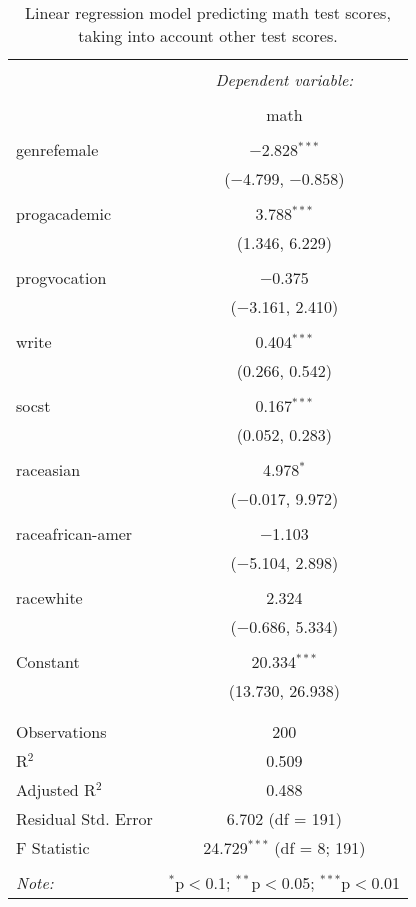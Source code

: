 
\begin{table}[!htbp] \centering 
  \caption{Linear regression model predicting math test scores, taking into 
          account other test scores.} 
  \label{tab::lm_math_peeking} 
\begin{tabular}{@{\extracolsep{5pt}}lc} 
\\[-1.8ex]\hline 
\hline \\[-1.8ex] 
 & \multicolumn{1}{c}{\textit{Dependent variable:}} \\ 
\cline{2-2} 
\\[-1.8ex] & math \\ 
\hline \\[-1.8ex] 
 genrefemale & $-$2.828$^{***}$ \\ 
  & ($-$4.799, $-$0.858) \\ 
  & \\ 
 progacademic & 3.788$^{***}$ \\ 
  & (1.346, 6.229) \\ 
  & \\ 
 progvocation & $-$0.375 \\ 
  & ($-$3.161, 2.410) \\ 
  & \\ 
 write & 0.404$^{***}$ \\ 
  & (0.266, 0.542) \\ 
  & \\ 
 socst & 0.167$^{***}$ \\ 
  & (0.052, 0.283) \\ 
  & \\ 
 raceasian & 4.978$^{*}$ \\ 
  & ($-$0.017, 9.972) \\ 
  & \\ 
 raceafrican-amer & $-$1.103 \\ 
  & ($-$5.104, 2.898) \\ 
  & \\ 
 racewhite & 2.324 \\ 
  & ($-$0.686, 5.334) \\ 
  & \\ 
 Constant & 20.334$^{***}$ \\ 
  & (13.730, 26.938) \\ 
  & \\ 
\hline \\[-1.8ex] 
Observations & 200 \\ 
R$^{2}$ & 0.509 \\ 
Adjusted R$^{2}$ & 0.488 \\ 
Residual Std. Error & 6.702 (df = 191) \\ 
F Statistic & 24.729$^{***}$ (df = 8; 191) \\ 
\hline 
\hline \\[-1.8ex] 
\textit{Note:}  & \multicolumn{1}{r}{$^{*}$p$<$0.1; $^{**}$p$<$0.05; $^{***}$p$<$0.01} \\ 
\end{tabular} 
\end{table} 
